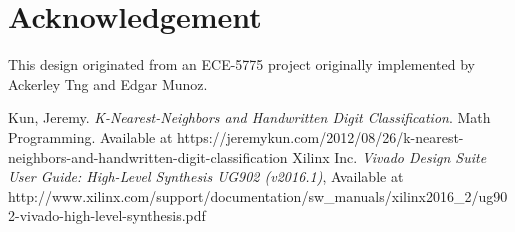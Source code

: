 \documentclass[paper=letter, fontsize=10pt]{scrartcl} %
\numberwithin{equation}{section} %
\numberwithin{figure}{section} %
\numberwithin{table}{section} %
\begin{document}

\section{Acknowledgement}
This design originated from an ECE-5775 project originally implemented by Ackerley Tng and Edgar Munoz. 

\begin{thebibliography}{9}

Kun, Jeremy. \emph{K-Nearest-Neighbors and Handwritten Digit Classification}. Math Programming. Available at https://jeremykun.com/2012/08/26/k-nearest-neighbors-and-handwritten-digit-classification
Xilinx Inc. \emph{Vivado Design Suite User Guide: High-Level Synthesis UG902 (v2016.1)},
Available at http://www.xilinx.com/support/documentation/sw\_manuals/xilinx2016\_2/ug902-vivado-high-level-synthesis.pdf

\end{thebibliography}
\end{document}
